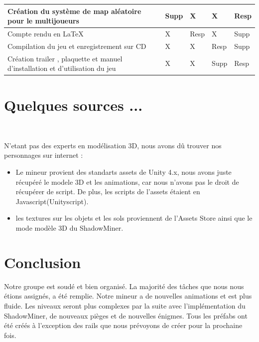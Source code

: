 \documentclass[titlepage, 13px, a4paper]{report}
\begin{document}
{\begin{tabular}{|p{6cm}|p{1.2cm}|p{1.2cm}|p{1.2cm}|p{1.2cm}|}
		\hline
		Création du système de map aléatoire pour le multijoueurs & Supp\footnotemark[2] & X & X & Resp\footnotemark[1] \\
		\hline
		Compte rendu en \LaTeX & X & Resp\footnotemark[1] & X & Supp\footnotemark[2]  \\
		\hline
		Compilation du jeu et enregistrement sur CD & X & X & Resp\footnotemark[1] & Supp\footnotemark[2] \\
		\hline
		Création trailer , plaquette et manuel d'installation et d'utilisation du jeu & X & X & Supp\footnotemark[2] & Resp\footnotemark[1] \\
		\hline
	\end{tabular}
	\label{repartition}		
}





\newpage
{}
\part{Quelques sources ...}
\paragraph{} \hspace{0pt} \\ 
N'etant pas des experts en modélisation 3D, nous avons dû trouver nos personnages sur internet : 
{\begin{itemize}
	\item Le mineur provient des standarts assets de Unity 4.x, nous avons juste récupéré le modele 3D et les animations, 
	car nous n'avons pas le droit de récupérer de script. De plus, les scripts de l'assets étaient en Javascript(Unityscript).
	\item les textures sur les objets et les sols proviennent de l'Assets Store ainsi que le mode modèle 3D du ShadowMiner.
\end{itemize}}






\newpage
{}
\part{Conclusion}
Notre groupe est soudé et bien organisé. La majorité des tâches que nous nous étions assignés, a été remplie. 
Notre mineur a de nouvelles animations et est plus fluide. Les niveaux seront plus complexes par la suite avec l’implémentation du ShadowMiner, 
de nouveaux pièges et de nouvelles énigmes. Tous les préfabs ont été créés à l’exception des rails que nous prévoyons de créer pour la prochaine fois.  \\ \\
\end{document}
